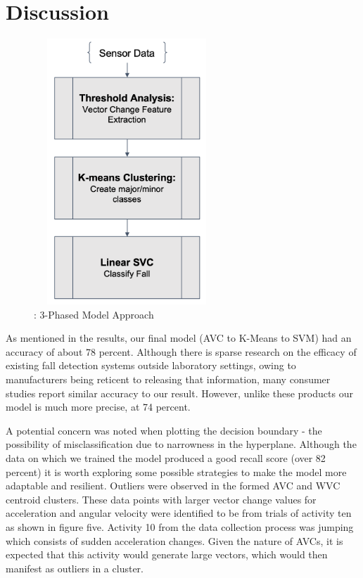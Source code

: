\documentclass{llncs}
\begin{document}
\section{Discussion}


\begin{figure}
	\centering
	\includegraphics[width=7cm, height=10cm]{images/ClassificationPipeline.png} 
	\caption{: 3-Phased Model Approach}
	\label{Figure 5: Classification Pipeline}
\end{figure}

	As mentioned in the results, our final model (AVC to K-Means to SVM) had an accuracy of about 78 percent. Although there is sparse research on the efficacy of existing fall detection systems outside laboratory settings, owing to manufacturers being reticent to releasing that information, many consumer studies report similar accuracy to our result.\cite{medreview} However, unlike these products our model is much more precise, at 74 percent. 
	
	A potential concern was noted when plotting the decision boundary - the possibility of misclassification due to narrowness in the hyperplane. Although the data on which we trained the model produced a good recall score (over 82 percent) it is worth exploring some possible strategies to make the model more adaptable and resilient. Outliers were observed in the formed AVC and WVC centroid clusters. These data points with larger vector change values for acceleration and angular velocity were identified to be from trials of activity ten as shown in figure five. Activity 10 from the data collection process was jumping which consists of sudden acceleration changes. Given the nature of AVCs, it is expected that this activity would generate large vectors, which would then manifest as outliers in a cluster.
	
\end{document}
